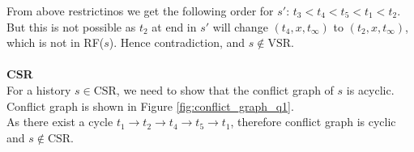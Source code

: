 \documentclass[12pt]{article}
\begin{document}
From above restrictinos we get the following order for $s'$: $t_3 < t_4 < t_5 < t_1 < t_2$. \\
But this is not possible as $t_2$ at end in $s'$ will change $(t_4, x, t_\infty)$ to $(t_2, x, t_\infty)$, which is not in RF($s$). Hence contradiction, and $s \notin \text{VSR}$.\\
\\
\textbf{CSR} \\
For a history $s \in \text{CSR}$, we need to show that the conflict graph of $s$ is acyclic.\\
Conflict graph is shown in Figure \ref{fig:conflict_graph_q1}.\\
As there exist a cycle $t_1 \rightarrow t_2 \rightarrow t_4 \rightarrow t_5 \rightarrow t_1$, therefore conflict graph is cyclic and $s \notin \text{CSR}$.
\begin{figure*}[h]
    \centering
    \caption{Conflict Graph}
    \label{fig:conflict_graph_q1}
\end{figure*}
\end{document}
